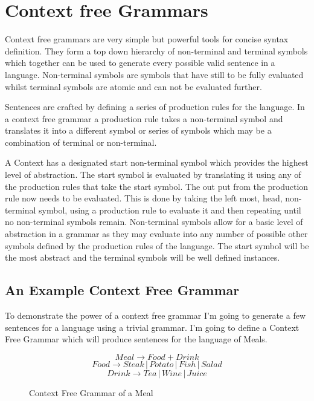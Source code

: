 \section{Context free Grammars}

Context free grammars are very simple but powerful tools for concise syntax definition.  They form a top down hierarchy of non-terminal and terminal symbols which together can be used to generate every possible valid sentence in a language.  Non-terminal symbols are symbols that have still to be fully evaluated whilst terminal symbols are atomic and can not be evaluated further. 





Sentences are crafted by defining a series of production rules for the language.  In a context free grammar a production rule takes a non-terminal symbol and translates it into a different symbol or series of symbols which may be a combination of terminal or non-terminal. 



A Context has a designated start non-terminal symbol which provides the highest level of abstraction.  The start symbol is evaluated by translating it using any of the production rules that take the start symbol.  The out put from the production rule now needs to be evaluated.  This is done by taking the left most, head, non-terminal symbol, using a production rule to evaluate it and then repeating until no non-terminal symbols remain. 
Non-terminal symbols allow for a basic level of abstraction in a grammar as they may evaluate into any number of possible other symbols defined by the production rules of the language.  The start symbol will be the most abstract and the terminal symbols will be well defined instances. 

\subsection{An Example Context Free Grammar}

To demonstrate the power of a context free grammar I'm going to generate a few sentences for a language using a trivial grammar.  I'm going to define a Context Free Grammar which will produce sentences for the language of Meals.  

\begin{figure}
\[ Meal \to Food + Drink \]
\[ Food \to Steak \,|\, Potato \,|\, Fish \,|\, Salad \]
\[ Drink \to Tea \,|\, Wine \,|\, Juice\]

\caption{Context Free Grammar of a Meal}
\end{figure}

